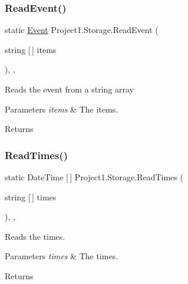 \subsubsection{\texorpdfstring{Read\+Event()}{ReadEvent()}}
{\footnotesize\ttfamily static \hyperlink{classProject1_1_1Event}{Event} Project1.\+Storage.\+Read\+Event (\begin{DoxyParamCaption}\item[{string \mbox{[}$\,$\mbox{]}}]{items }\end{DoxyParamCaption})\hspace{0.3cm}{\ttfamily [inline]}, {\ttfamily [static]}, {\ttfamily [package]}}



Reads the event from a string array 


\begin{DoxyParams}{Parameters}
{\em items} & The items.\\
\hline
\end{DoxyParams}
\begin{DoxyReturn}{Returns}

\end{DoxyReturn}
\mbox{\label{classProject1_1_1Storage_a376dc3238d3e8ab23781d5401e428865}} 
\subsubsection{\texorpdfstring{Read\+Times()}{ReadTimes()}}
{\footnotesize\ttfamily static Date\+Time \mbox{[}$\,$\mbox{]} Project1.\+Storage.\+Read\+Times (\begin{DoxyParamCaption}\item[{string \mbox{[}$\,$\mbox{]}}]{times }\end{DoxyParamCaption})\hspace{0.3cm}{\ttfamily [inline]}, {\ttfamily [static]}, {\ttfamily [private]}}



Reads the times. 


\begin{DoxyParams}{Parameters}
{\em times} & The times.\\
\hline
\end{DoxyParams}
\begin{DoxyReturn}{Returns}

\end{DoxyReturn}
\mbox{\label{classProject1_1_1Storage_a609f09f2cea1638321ac856303b7837d}} 
